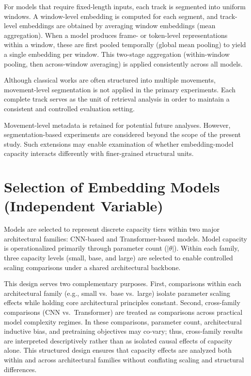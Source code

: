 For models that require fixed-length inputs, each track is segmented into uniform windows. 
A window-level embedding is computed for each segment, and track-level embeddings are obtained by averaging window embeddings (mean aggregation). 
When a model produces frame- or token-level representations within a window, these are first pooled temporally (global mean pooling) to yield a single embedding per window. 
This two-stage aggregation (within-window pooling, then across-window averaging) is applied consistently across all models.

Although classical works are often structured into multiple movements, movement-level segmentation is not applied in the primary experiments. 
Each complete track serves as the unit of retrieval analysis in order to maintain a consistent and controlled evaluation setting.

Movement-level metadata is retained for potential future analyses. 
However, segmentation-based experiments are considered beyond the scope of the present study. 
Such extensions may enable examination of whether embedding-model capacity interacts differently with finer-grained structural units.


\section{Selection of Embedding Models (Independent Variable)}

Models are selected to represent discrete capacity tiers within two major architectural families: CNN-based and Transformer-based models. 
Model capacity is operationalized primarily through parameter count ($|\theta|$). 
Within each family, three capacity levels (small, base, and large) are selected to enable controlled scaling comparisons under a shared architectural backbone.

This design serves two complementary purposes. 
First, comparisons within each architectural family (e.g., small vs.\ base vs.\ large) isolate parameter scaling effects while holding core architectural principles constant. 
Second, cross-family comparisons (CNN vs.\ Transformer) are treated as comparisons across practical model complexity regimes. 
In these comparisons, parameter count, architectural inductive bias, and pretraining objectives may co-vary; thus, cross-family results are interpreted descriptively rather than as isolated causal effects of capacity alone.
This structured design ensures that capacity effects are analyzed both within and across architectural families without conflating scaling and structural differences.


